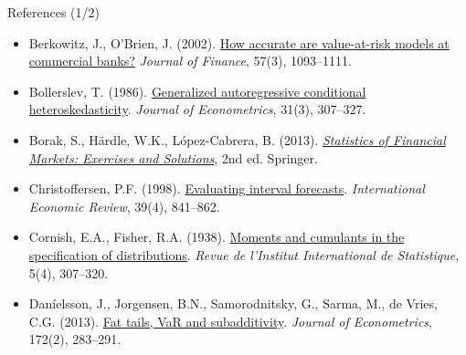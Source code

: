 \begin{frame}{References (1/2)}
\begin{itemize}
    \item Berkowitz, J., O'Brien, J. (2002). \href{https://doi.org/10.1111/1540-6261.00455}{How accurate are value-at-risk models at commercial banks?} \textit{Journal of Finance}, 57(3), 1093--1111.
    \item Bollerslev, T. (1986). \href{https://doi.org/10.1016/0304-4076(86)90063-1}{Generalized autoregressive conditional heteroskedasticity}. \textit{Journal of Econometrics}, 31(3), 307--327.
    \item Borak, S., Härdle, W.K., López-Cabrera, B. (2013). \href{https://doi.org/10.1007/978-3-642-33929-5}{\textit{Statistics of Financial Markets: Exercises and Solutions}}, 2nd ed. Springer.
    \item Christoffersen, P.F. (1998). \href{https://doi.org/10.2307/2527341}{Evaluating interval forecasts}. \textit{International Economic Review}, 39(4), 841--862.
    \item Cornish, E.A., Fisher, R.A. (1938). \href{https://doi.org/10.2307/1400905}{Moments and cumulants in the specification of distributions}. \textit{Revue de l'Institut International de Statistique}, 5(4), 307--320.
    \item Daníelsson, J., Jorgensen, B.N., Samorodnitsky, G., Sarma, M., de Vries, C.G. (2013). \href{https://doi.org/10.1016/j.jeconom.2012.08.011}{Fat tails, VaR and subadditivity}. \textit{Journal of Econometrics}, 172(2), 283--291.
\end{itemize}
\end{frame}

